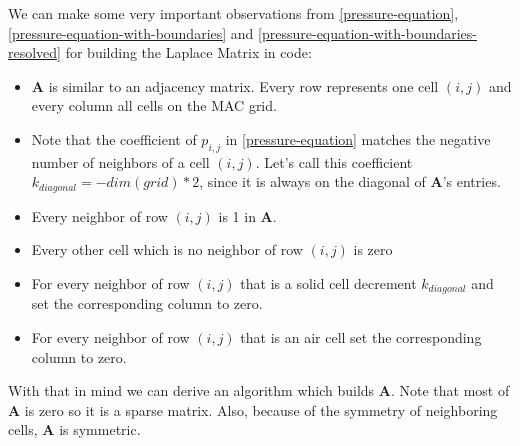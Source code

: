 \par We can make some very important observations from \ref{pressure-equation}, \ref{pressure-equation-with-boundaries} and \ref{pressure-equation-with-boundaries-resolved} for building the Laplace Matrix in code:
\begin{itemize}
	  \item $\mathbf{A}$ is similar to an adjacency matrix. Every row represents one cell $(i,j)$ and every column all cells on the MAC grid.
      \item Note that the coefficient of $p_{i,j}$ in \ref{pressure-equation} matches the negative number of neighbors of a cell $(i,j)$. Let's call this coefficient $k_{diagonal} = -dim(grid) * 2$, since it is always on the diagonal of $\mathbf{A}$'s entries.
      \item Every neighbor of row $(i,j)$ is 1 in $\mathbf{A}$.
      \item Every other cell which is no neighbor of row $(i,j)$ is zero
      \item For every neighbor of row $(i,j)$ that is a solid cell decrement $k_{diagonal}$ and set the corresponding column to zero.
      \item For every neighbor of row $(i,j)$ that is an air cell set the corresponding column to zero.
\end{itemize}
\par With that in mind we can derive an algorithm which builds $\mathbf{A}$. Note that most of $\mathbf{A}$ is zero so it is a sparse matrix. Also, because of the symmetry of neighboring cells, $\mathbf{A}$ is symmetric.